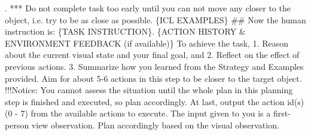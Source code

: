 \begin{tcolorbox}[colback=gray!5!white, colframe=gray!75!black, 
title=Prompt for EB-Navigation at remaining steps, boxrule=0.5mm, width=\textwidth, arc=3mm, auto outer arc=true]
. *** Do not complete task too early until you can not move any closer to the object, i.e. try to be as close as possible.\newline
\newline
\{ICL EXAMPLES\}\newline
\newline
\#\# Now the human instruction is: \{TASK INSTRUCTION\}. \newline 
\newline 
\{ACTION HISTORY \& ENVIRONMENT FEEDBACK (if available)\}\newline
\newline 
To achieve the task, 1. Reason about the current visual state and your final goal, and 2. Reflect on the effect of previous actions. 3. Summarize how you learned from the Strategy and Examples provided. \newline 
Aim for about 5-6 actions in this step to be closer to the target object. !!!Notice: You cannot assess the situation until the whole plan in this planning step is finished and executed, so plan accordingly.\newline 
At last, output the action id(s) (0 - 7) from the available actions to execute. \newline 
\newline 
The input given to you is a first-person view observation. Plan accordingly based on the visual observation.
\end{tcolorbox}

